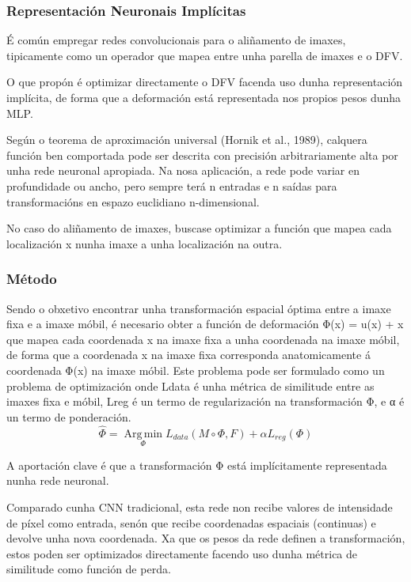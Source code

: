 \subsubsection{Representación Neuronais Implícitas}
\label{subsubsec:Representación Neuronais Implícitas}

É común empregar redes convolucionais para o aliñamento de imaxes,
 tipicamente como un operador que mapea entre unha parella de imaxes e o DFV.

O que \cite{wolterink2021implicit} propón é optimizar directamente o DFV facenda uso
 dunha representación implícita, de forma que a deformación está representada nos propios pesos dunha MLP.

Según o teorema de aproximación universal (Hornik et al., 1989), calquera función ben comportada
 pode ser descrita con precisión arbitrariamente alta por unha rede neuronal apropiada. 
 Na nosa aplicación, a rede pode variar en profundidade ou ancho, pero sempre terá n entradas e n saídas para transformacións en espazo euclidiano n-dimensional.




No caso do aliñamento de imaxes, buscase optimizar a función que mapea cada localización x nunha imaxe a unha localización na outra.


 \subsubsection{Método}
 \label{subsubsec:Método}

Sendo o obxetivo encontrar unha transformación espacial óptima entre a imaxe fixa e a imaxe móbil,
 é necesario obter a función de deformación  Φ(x) = u(x) + x que mapea cada coordenada x na imaxe fixa a unha coordenada na imaxe móbil, 
 de forma que a coordenada x na imaxe fixa corresponda anatomicamente á coordenada Φ(x) na imaxe móbil.
Este problema pode ser formulado como un problema de optimización onde Ldata é unha métrica de similitude entre as imaxes fixa e móbil, Lreg é un termo de regularización na transformación Φ, e α é un termo de ponderación.
\begin{equation}
    \hat{\Phi} = \operatorname*{Arg\,min}_{\Phi} L_{data}(M \circ \Phi, F) + \alpha L_{reg}(\Phi)
\end{equation}

A aportación clave é que a transformación Φ está implícitamente representada nunha rede neuronal.

Comparado cunha CNN tradicional, esta rede non recibe valores de intensidade de píxel como entrada,
 senón que recibe coordenadas espaciais (continuas) e devolve unha nova coordenada.
Xa que os pesos da rede definen a transformación, estos poden ser optimizados directamente 
facendo uso dunha métrica de similitude como función de perda.

